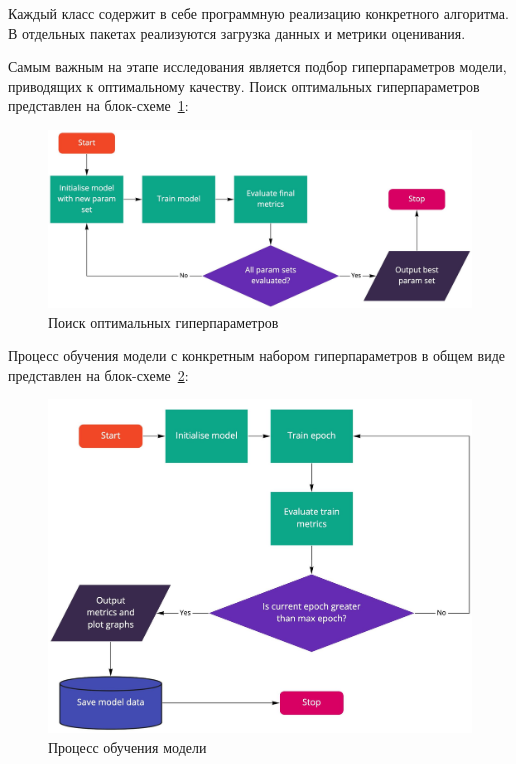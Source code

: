 Каждый класс содержит в себе программную реализацию конкретного алгоритма.
В отдельных пакетах реализуются загрузка данных и метрики оценивания.

Самым важным на этапе исследования является подбор гиперпараметров модели, приводящих к оптимальному качеству.
Поиск оптимальных гиперпараметров представлен на блок-схеме~\ref{fig:params_search_diagram}:

\begin{figure}[h!]
\centering
\begin{minipage}{0.9\textwidth}
\centering
\includegraphics[width=0.9\linewidth]{images/params_search_diagram}
\caption{Поиск оптимальных гиперпараметров}
\label{fig:params_search_diagram}
\end{minipage}
\end{figure}

\pagebreak
Процесс обучения модели с конкретным набором гиперпараметров в общем виде представлен на блок-схеме~\ref{fig:train_model_diagram}:

\vspace{1em}
\begin{figure}[h!]
\centering
\begin{minipage}{0.9\textwidth}
\centering
\includegraphics[width=0.9\linewidth]{images/train_model_diagram}
\caption{Процесс обучения модели}
\label{fig:train_model_diagram}
\end{minipage}
\end{figure}

